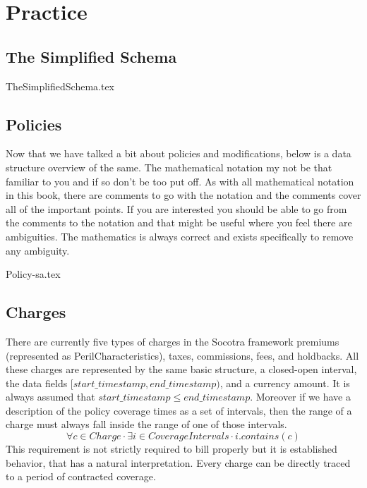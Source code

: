 \chapter{Practice}
\label{intro:03} %


\section{The Simplified Schema}
\label{sec:03:1}
{TheSimplifiedSchema.tex}

\section{Policies}
\label{sec:03:2}
Now that we have talked a bit about policies and modifications, below is a data structure overview of the same. The mathematical notation my not be
that familiar to you and if so don't be too put off. As with all mathematical notation in this book, there are comments to go with the notation
and the comments cover all of the important points. If you are interested you should be able to go from the comments to the notation and that
might be useful where you feel there are ambiguities. The mathematics is always correct and exists specifically to remove any ambiguity.

{Policy-sa.tex}

\section{Charges}
\label{sec:03:3}
There are currently five types of charges in the Socotra framework premiums (represented as PerilCharacteristics), taxes,
commissions, fees, and holdbacks. All these charges are represented by the same basic structure, a closed-open
interval, the data fields $[start\_timestamp, end\_timestamp)$, and a currency amount. It is
always assumed that $start\_timestamp \leq end\_timestamp$. Moreover if we have a description of the
policy coverage times as a set of intervals, then the range of a charge must always
fall inside the range of one of those intervals.
\begin{equation*}
\forall c \in Charge \cdot \exists i \in CoverageIntervals \cdot i.contains(c)
\end{equation*}
This requirement is not strictly required to bill properly but it is established behavior, that has a natural
interpretation. Every charge can be directly traced to a period of contracted coverage.

